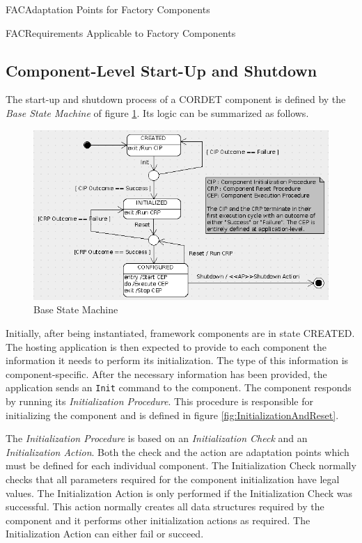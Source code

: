 \documentclass[a4paper,10pt]{article}
\newenvironment{cr_req}[2]
{%
\begin{longtable}{|l|p{9.8cm}|}
\caption{#2} \\
\hline
\rowcolor{light-gray}
\textbf{Req. ID} & \textbf{Requirement Text}\\
\hline\hline
\endfirsthead
\rowcolor{light-gray}
\textbf{Req. ID} & \textbf{Requirement Text}\\
\hline\hline
\endhead
\DTLforeach*[\DTLiseq{\cat}{#1}]{dbReq}{\cat=Category,\type=Type,\id=Id,\reqText=Text}
{\DTLiffirstrow{}{\\\hline}\cat-\id/\type & \textit{\reqText}}\\\hline
}
{\end{longtable}}
\newenvironment{cr_ap}[2]
{%
\begin{longtable}{|l|p{4.7cm}|p{4.9cm}|}
\caption{#2} \\
\hline
\rowcolor{light-gray}
\textbf{AP ID} & \textbf{Adaptation Point} & \textbf{Default Value}\\
\hline\hline
\endfirsthead
\rowcolor{light-gray}
\textbf{AP ID} & \textbf{Adaptation Point} & \textbf{Default Value}\\
\hline\hline
\endhead
\DTLforeach*[\DTLiseq{\cat}{#1}]{dbAP}{\cat=Category,\id=Id,\ap=AP,\defValue=DefValue}
{\DTLiffirstrow{}{\\\hline}\cat-\id & \ap & \defValue}\\\hline
}
{\end{longtable}}
\begin{document}
\begin{cr_ap}{FAC}{Adaptation Points for Factory Components}
\end{cr_ap}
\newpage
\begin{cr_req}{FAC}{Requirements Applicable to Factory Components}
\end{cr_req}

\subsection{Component-Level Start-Up and Shutdown}\label{sec:BaseCmp}
The start-up and shutdown process of a CORDET component is defined by the \textit{Base State Machine} of figure \ref{fig:BaseSM}. Its logic can be summarized as follows.

\begin{figure}[ht]
 \centering
 \includegraphics[scale=0.3,keepaspectratio=true]{BaseSM.png}
 \caption{Base State Machine}
 \label{fig:BaseSM}
\end{figure}

Initially, after being instantiated, framework components are in state CREATED. 
The hosting application is then expected to provide to each component the information it needs to perform its initialization. 
The type of this information is component-specific. 
After the necessary information has been provided, the application sends an \texttt{Init} command to the component. 
The component responds by running its \textit{Initialization Procedure}. 
This procedure is responsible for initializing the component and is defined in figure  \ref{fig:InitializationAndReset}. 

The \textit{Initialization Procedure} is based on an \textit{Initialization Check} and an \textit{Initialization Action}. 
Both the check and the action are adaptation points which must be defined for each individual component. 
The Initialization Check normally checks that all parameters required for the component initialization have legal values. 
The Initialization Action is only performed if the Initialization Check was successful. 
This action normally creates all data structures required by the component and it performs other initialization actions as required. 
The Initialization Action can either fail or succeed.
\end{document}
